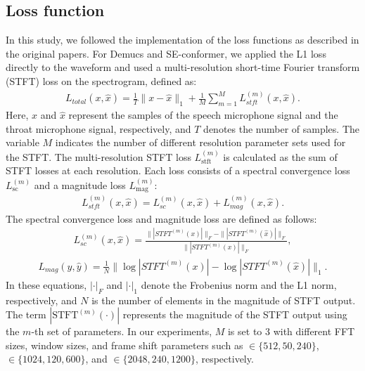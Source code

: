 \documentclass[10pt]{wlscirep}
\begin{document}
\subsection*{Loss function}
In this study, we followed the implementation of the loss functions as described in the original papers\cite{defossez2020real, kim21seconformer, wang2021tstnn}. For Demucs and SE-conformer, we applied the L1 loss directly to the waveform and used a multi-resolution short-time Fourier transform (STFT) loss on the spectrogram, defined as:
\begin{align}
    L_{total}(x,\hat{x})=\frac{1}{T} \|x-\hat{x}\|_1 + \frac{1}{M}\sum_{m=1}^{M}L_{stft}^{(m)}(x,\hat{x}).
\end{align}
Here, $x$ and $\hat{x}$ represent the samples of the speech microphone signal and the throat microphone signal, respectively, and $T$ denotes the number of samples. The variable $M$ indicates the number of different resolution parameter sets used for the STFT.
The multi-resolution STFT loss $L_{\text{stft}}^{(m)}$ is calculated as the sum of STFT losses at each resolution. Each loss consists of a spectral convergence loss $L_{\text{sc}}^{(m)}$ and a magnitude loss $L_{\text{mag}}^{(m)}$:
\begin{align}
    L_{stft}^{(m)}(x,\hat{x}) = L_{sc}^{(m)}(x,\hat{x}) +L_{mag}^{(m)}(x,\hat{x}).
\end{align}
The spectral convergence loss and magnitude loss are defined as follows:
\begin{align}
    L_{sc}^{(m)}(x,\hat{x})=\frac{\||STFT^{(m)}(x)|\|_F-\||STFT^{(m)}(\hat{x})|\|_F}{\||STFT^{(m)}(x)|\|_F},
\end{align}
\begin{align}
    L_{mag}(y,\hat{y})=\frac{1}{N}\|\log |STFT^{(m)}(x)|-\log |STFT^{(m)}(\hat{x})| \|_1.
\end{align}
In these equations, $| \cdot |_F$ and $| \cdot |_1$ denote the Frobenius norm and the L1 norm, respectively, and $N$ is the number of elements in the magnitude of STFT output. The term $| \text{STFT}^{(m)}(\cdot) |$ represents the magnitude of the STFT output using the $m$-th set of parameters. In our experiments, $M$ is set to 3 with different FFT sizes, window sizes, and frame shift parameters such as $\in \{512, 50, 240\}$, $\in \{1024, 120, 600\}$, and $\in \{2048, 240, 1200\}$, respectively.
\end{document}
